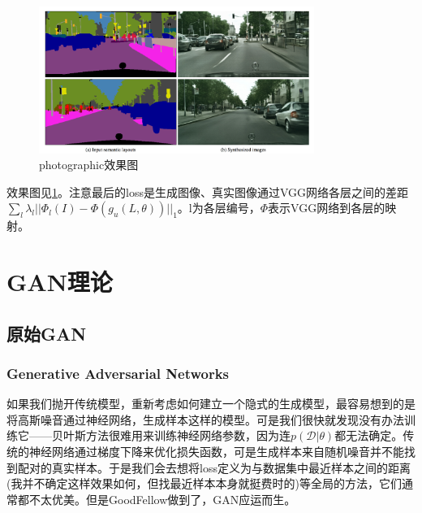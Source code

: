 \documentclass[a4paper]{article}
\begin{document}
\begin{figure}
\centering
\includegraphics[width=0.8\textwidth]{./img/41.png}
\caption{photographic效果图}
\label{fig:41}
\end{figure}

效果图见\ref{fig:41}。注意最后的loss是生成图像、真实图像通过VGG网络各层之间的差距$\sum_l \lambda_l||\Phi_l(I)-\Phi(g_u(L,\theta))||_1$。l为各层编号，$\Phi$表示VGG网络到各层的映射。
\section{GAN理论}
\subsection{原始GAN}
\subsubsection{Generative Adversarial Networks\cite{gan}}
如果我们抛开传统模型，重新考虑如何建立一个隐式的生成模型，最容易想到的是将高斯噪音通过神经网络，生成样本这样的模型。可是我们很快就发现没有办法训练它——贝叶斯方法很难用来训练神经网络参数，因为连$p(\mathcal{D}|\theta)$都无法确定。传统的神经网络通过梯度下降来优化损失函数，可是生成样本来自随机噪音并不能找到配对的真实样本。于是我们会去想将loss定义为与数据集中最近样本之间的距离(我并不确定这样效果如何，但找最近样本本身就挺费时的)等全局的方法，它们通常都不太优美。但是GoodFellow做到了，GAN应运而生。
\end{document}
